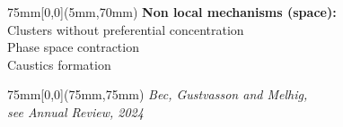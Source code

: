 {\begin{textblock*}{75mm}[0,0](5mm,70mm)
	\small{
		\textbf{Non local mechanisms (space):}\\
	}
	\footnotesize{
		\textcolor{orange!40!red}{
			Clusters without preferential concentration\\
			Phase space contraction\\
			Caustics formation\\
	}}	
\end{textblock*}

\begin{textblock*}{75mm}[0,0](75mm,75mm)
	\footnotesize{
		\textcolor{orange!40!red}{
			\textit{Bec, Gustvasson and Melhig,\\
				see Annual Review, 2024}}
	}	
\end{textblock*}


}